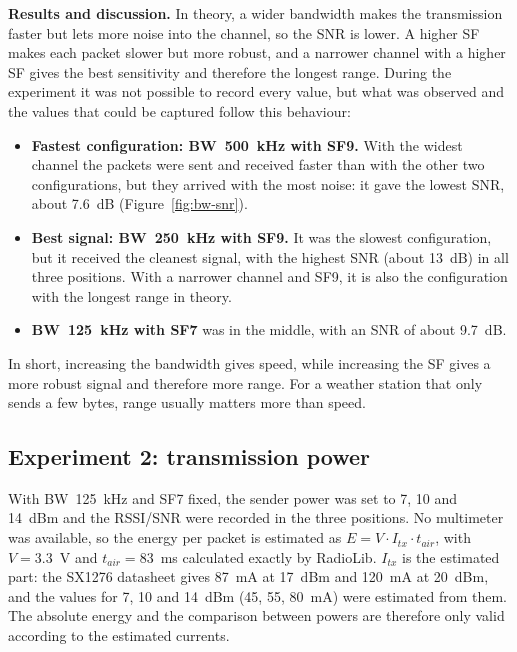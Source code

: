 \documentclass[11pt,a4paper]{article}
\begin{document}
\textbf{Results and discussion.} In theory, a wider bandwidth makes the transmission faster
but lets more noise into the channel, so the SNR is lower. A higher SF makes each packet
slower but more robust, and a narrower channel with a higher SF gives the best sensitivity and
therefore the longest range. During the experiment it was not possible to record every value, but what was observed and the values
that could be captured follow this behaviour:
\begin{itemize}
  \item \textbf{Fastest configuration: BW~500~kHz with SF9.} With the widest channel the
        packets were sent and received faster than with the other two configurations, but
        they arrived with the most noise: it gave the lowest SNR, about 7.6~dB
        (Figure~\ref{fig:bw-snr}).
  \item \textbf{Best signal: BW~250~kHz with SF9.} It was the slowest configuration, but it
        received the cleanest signal, with the highest SNR (about 13~dB) in all three
        positions. With a narrower channel and SF9, it is also the configuration with the
        longest range in theory.
  \item \textbf{BW~125~kHz with SF7} was in the middle, with an SNR of about 9.7~dB.
\end{itemize}
In short, increasing the bandwidth gives speed, while increasing the SF gives a more robust
signal and therefore more range. For a weather station that only sends a few bytes, range
usually matters more than speed.


\subsection{Experiment 2: transmission power}
\label{sec:power}

With BW~125~kHz and SF7 fixed, the sender power was set to 7, 10 and 14~dBm and the RSSI/SNR
were recorded in the three positions. No multimeter was available, so the energy per packet
is estimated as $E = V \cdot I_{tx} \cdot t_{air}$, with $V = 3.3$~V and $t_{air} = 83$~ms
calculated exactly by RadioLib. $I_{tx}$ is the estimated
part: the SX1276 datasheet gives 87~mA at 17~dBm and 120~mA at 20~dBm, and
the values for 7, 10 and 14~dBm (45, 55, 80~mA) were estimated from them. The absolute energy
and the comparison between powers are therefore only valid according to the estimated currents.
\end{document}
